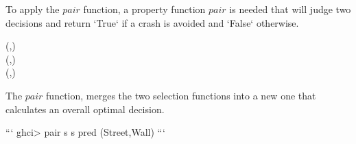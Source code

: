 To apply the $pair$ function, a property function $pair$ is needed that will judge two 
decisions and return `True` if a crash is avoided and `False` otherwise.
\begin{hscode}\SaveRestoreHook
{}%
%
%
%
\>[3]{}\mathbin{::}(,)\to {}\<[E]%
\\
\>[3]{}\;(,)\mathrel{=}\<[E]%
\\
\>[3]{}\;(,)\mathrel{=}\<[E]%
\\
\>[3]{}\;\anonymous {}\<[22]%
\>[22]{}\mathrel{=}\<[E]%
\ColumnHook
\end{hscode}\resethooks
The $pair$ function, merges the two selection functions into a new one that calculates an  
overall optimal decision.

```
ghci> pair s s pred
(Street,Wall)
```

